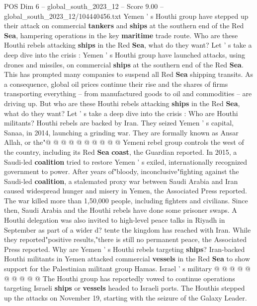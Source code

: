 \begin{textsample}{POS Dim 6 – global\_south\_2023\_12 – Score 9.00 – global\_south\_2023\_12/104440456.txt}  \label{ex:f6_pos_109}
Yemen ' s Houthi group have stepped up their attack on commercial \textbf{tankers} and \textbf{ships} at the southern end of the Red \textbf{Sea}, hampering operations in the key \textbf{maritime} trade route.
Who are these Houthi rebels attacking \textbf{ships} in the Red \textbf{Sea}, what do they want?
Let ' s take a deep dive into the crisis : Yemen ' s Houthi group have launched attacks, using drones and missiles, on commercial \textbf{ships} at the southern end of the Red \textbf{Sea}.
This has prompted many companies to suspend all Red \textbf{Sea} shipping transits.
As a consequence, global oil prices continue their rise and the shares of firms transporting everything -- from manufactured goods to oil and commodities -- are driving up.
But who are these Houthi rebels attacking \textbf{ships} in the Red \textbf{Sea}, what do they want?
Let ' s take a deep dive into the crisis : Who are Houthi militants?
Houthi rebels are backed by Iran.
They seized Yemen ' s capital, Sanaa, in 2014, launching a grinding war.
They are formally known as Ansar Allah, or the"@ @ @ @ @ @ @ @ @ @ Yemeni rebel group controls the west of the country, including its Red \textbf{Sea} \textbf{coast}, the Guardian reported.
In 2015, a Saudi-led \textbf{coalition} tried to restore Yemen ' s exiled, internationally recognized government to power.
After years of"bloody, inconclusive"fighting against the Saudi-led \textbf{coalition}, a stalemated proxy war between Saudi Arabia and Iran caused widespread hunger and misery in Yemen, the Associated Press reported.
The war killed more than 1,50,000 people, including fighters and civilians.
Since then, Saudi Arabia and the Houthi rebels have done some prisoner swaps.
A Houthi delegation was also invited to high-level peace talks in Riyadh in September as part of a wider d? tente the kingdom has reached with Iran.
While they reported"positive results,"there is still no permanent peace, the Associated Press reported.
Why are Yemen ' s Houthi rebels targeting \textbf{ships}?
Iran-backed Houthi militants in Yemen attacked commercial \textbf{vessels} in the Red \textbf{Sea} to show support for the Palestinian militant group Hamas.
Israel ' s military @ @ @ @ @ @ @ @ @ @ The Houthi group has reportedly vowed to continue operations targeting Israeli \textbf{ships} or \textbf{vessels} headed to Israeli ports.
The Houthis stepped up the attacks on November 19, starting with the seizure of the Galaxy Leader.

\end{textsample}
